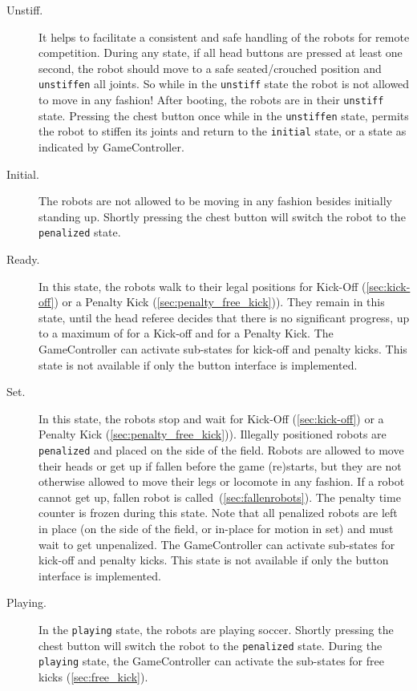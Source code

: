 \begin{description}
  \item [Unstiff.] It helps to facilitate a consistent and safe handling of the robots for remote competition. During any state, if all head buttons are pressed at least one second, the robot should move to a safe seated/crouched position and \texttt{unstiffen} all joints. So while in the \texttt{unstiff} state the robot is not allowed to move in any fashion! After booting, the robots are in their \texttt{unstiff} state. Pressing the chest button once while in the \texttt{unstiffen} state, permits the robot to stiffen its joints and return to the \texttt{initial} state, or a state as indicated by GameController.

  \item[Initial.] The robots are not allowed to be moving in any fashion besides initially standing up. Shortly pressing the chest button will switch the robot to the \texttt{penalized} state.

  \item[Ready.] In this state, the robots walk to their legal positions for Kick-Off  (\cf \cref{sec:kick-off}) or a Penalty Kick (\cf \cref{sec:penalty_free_kick})). They remain in this state, until the head referee decides that there is no significant progress, up to a maximum of \KickOffAutoTime for a Kick-off and \PenaltyFreeKickSetupTime for a Penalty Kick.
  The GameController can activate sub-states for kick-off and penalty kicks.
  This state is not available if only the button interface is implemented.

  \item[Set.] In this state, the robots stop and wait for Kick-Off  (\cf \cref{sec:kick-off}) or a Penalty Kick (\cf \cref{sec:penalty_free_kick})).
  Illegally positioned robots are \texttt{penalized} and placed on the side of the field.
  Robots are allowed to move their heads or get up if fallen before the game (re)starts, but they are not otherwise allowed to move their legs or locomote in any fashion.
  If a robot cannot get up, fallen robot is called~(\cf \cref{sec:fallenrobots}).
  The penalty time counter is frozen during this state.
  Note that all penalized robots are left in place (on the side of the field, or in-place for motion in set) and must wait to get unpenalized.
  The GameController can activate sub-states for kick-off and penalty kicks.
  This state is not available if only the button interface is implemented.

  \item[Playing.] In the \texttt{playing} state, the robots are playing soccer. Shortly pressing the chest button will switch the robot to the \texttt{penalized} state. During the \texttt{playing} state, the GameController can activate the sub-states for free kicks (\cf \cref{sec:free_kick}).


\end{description}
